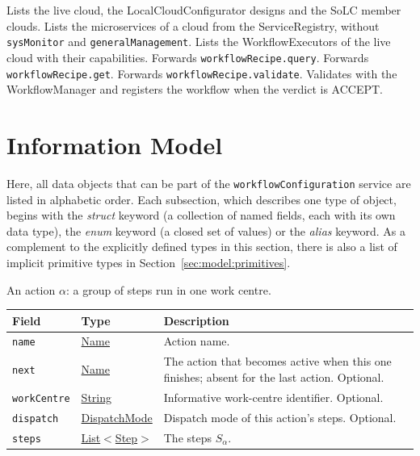 \documentclass[a4paper]{arrowhead}
\newcommand{\mref}[1]{{\textcolor{ArrowheadPurple}{\hyperref[sec:model:#1]{#1}}}}
\newcommand{\pref}[1]{{\textcolor{ArrowheadGrey}{\hyperref[sec:model:primitives:#1]{#1}}}}
\begin{document}
Lists the live cloud, the LocalCloudConfigurator designs and the SoLC member clouds.
Lists the microservices of a cloud from the ServiceRegistry, without \texttt{sysMonitor} and \texttt{generalManagement}.
Lists the WorkflowExecutors of the live cloud with their capabilities.
Forwards \texttt{workflowRecipe.query}.
Forwards \texttt{workflowRecipe.get}.
Forwards \texttt{workflowRecipe.validate}.
Validates with the WorkflowManager and registers the workflow when the verdict is ACCEPT.

\newpage
\section{Information Model}
\label{sec:model}
Here, all data objects that can be part of the \texttt{workflowConfiguration} service are listed in alphabetic order. Each
subsection, which describes one type of object, begins with the \textit{struct} keyword (a collection of named fields,
each with its own data type), the \textit{enum} keyword (a closed set of values) or the \textit{alias} keyword. As a
complement to the explicitly defined types in this section, there is also a list of implicit primitive types in
Section~\ref{sec:model:primitives}.

An action $\alpha$: a group of steps run in one work centre.

{\small
\begin{longtable}{|p{3.9cm}|p{4.4cm}|p{7.5cm}|}

\hline
\rowcolor{gray!33} Field & Type & Description \\ \hline
\endhead
\texttt{name} & \pref{Name} & Action name. \\ \hline
\texttt{next} & \pref{Name} & The action that becomes active when this one finishes; absent for the last action. Optional. \\ \hline
\texttt{workCentre} & \pref{String} & Informative work-centre identifier. Optional. \\ \hline
\texttt{dispatch} & \mref{DispatchMode} & Dispatch mode of this action's steps. Optional. \\ \hline
\texttt{steps} & \pref{List}$<$\mref{Step}$>$ & The steps $S_\alpha$. \\ \hline
\end{longtable}
}
\end{document}
